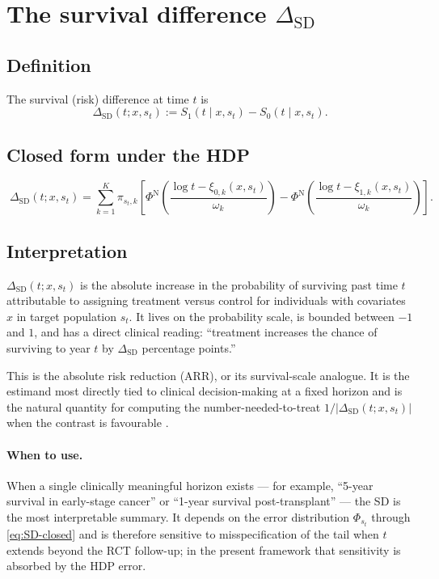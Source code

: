 \documentclass[11pt]{article}
\newcommand{\Spot}{S}
\newcommand{\SD}{\mathrm{SD}}
\begin{document}
\section{The survival difference $\Delta_{\SD}$}

\subsection{Definition}

The survival (risk) difference at time $t$ is
\begin{equation}
  \Delta_{\SD}(t; x, s_{t})
  := \Spot_{1}(t \mid x, s_{t}) - \Spot_{0}(t \mid x, s_{t}).
\end{equation}

\subsection{Closed form under the HDP}

\begin{equation}
  \boxed{\;
    \Delta_{\SD}(t; x, s_{t})
    = \sum_{k=1}^{K} \pi_{s_{t}, k}\!\left[
        \Phi^{\mathrm{N}}\!\left(\frac{\log t - \xi_{0, k}(x, s_{t})}{\omega_{k}}\right)
      - \Phi^{\mathrm{N}}\!\left(\frac{\log t - \xi_{1, k}(x, s_{t})}{\omega_{k}}\right)
    \right].
  \;}
  \label{eq:SD-closed}
\end{equation}

\subsection{Interpretation}

$\Delta_{\SD}(t; x, s_{t})$ is the absolute increase in the probability of
surviving past time $t$ attributable to assigning treatment versus control
for individuals with covariates $x$ in target population $s_{t}$. It lives
on the probability scale, is bounded between $-1$ and $1$, and has a direct
clinical reading: ``treatment increases the chance of surviving to year $t$
by $\Delta_{\SD}$ percentage points.''

This is the absolute risk reduction (ARR), or its survival-scale analogue.
It is the estimand most directly tied to clinical decision-making at a fixed
horizon and is the natural quantity for computing the number-needed-to-treat
$1/|\Delta_{\SD}(t; x, s_{t})|$ when the contrast is favourable
\citep{Cook1995}.

\paragraph{When to use.} When a single clinically meaningful horizon
exists --- for example, ``5-year survival in early-stage cancer'' or
``1-year survival post-transplant'' --- the SD is the most interpretable
summary. It depends on the error distribution $\Phi_{s_{t}}$ through
\eqref{eq:SD-closed} and is therefore sensitive to misspecification of the
tail when $t$ extends beyond the RCT follow-up; in the present framework
that sensitivity is absorbed by the HDP error.
\end{document}
